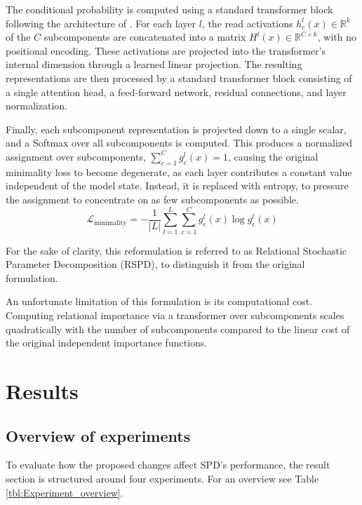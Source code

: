 \documentclass{article}
\begin{document}
The conditional probability is computed using a standard transformer block following the architecture of \autocite{vaswani2023attentionneed}. For each layer $l$,
the read activations \(h_c^l(x) \in \mathbb{R}^k\) of the \(C\) subcomponents are concatenated into a matrix \(H^l(x) \in \mathbb{R}^{C \times k}\),
with no positional encoding.
These activations are projected into the transformer's internal dimension through a learned linear projection. The resulting representations are then processed by a standard transformer block consisting of a single attention head,
a feed-forward network, residual connections, and layer normalization.

Finally, each subcomponent representation is projected down to a single scalar, and a Softmax over all subcomponents is computed.
This produces a normalized assignment over subcomponents, $\sum_{c=1}^{C}g^l_c(x) = 1$,
causing the original minimality loss to become degenerate, as each layer contributes a constant value independent of the model state.
Instead, it is replaced
with entropy, to pressure the assignment to concentrate on as few subcomponents as possible. 
\begin{equation}
    \mathcal{L}_{\text{minimality}} = - \frac{1}{|L|} \sum_{l=1}^{L} \sum_{c=1}^{C} g^l_c(x) \log g^l_c(x)
\end{equation}

For the sake of clarity, this reformulation is referred to as Relational Stochastic Parameter Decomposition (RSPD), to distinguish it from the original formulation.


An unfortunate limitation of this formulation is its computational cost. Computing
relational importance via a transformer over subcomponents scales
quadratically with the number of subcomponents compared to the linear cost of the original independent importance functions. 





\section{Results}
\subsection{Overview of experiments}
To evaluate how the proposed changes affect SPD's performance,
the result section is structured around four experiments.
For an overview see Table \ref{tbl:Experiment_overview}.
\end{document}
